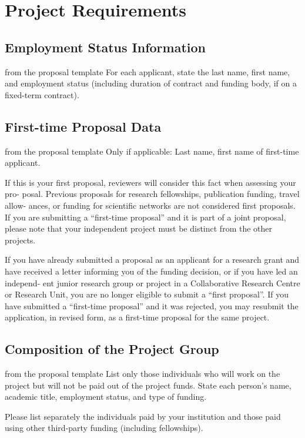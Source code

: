 \section{Project Requirements}

\subsection{Employment Status Information}

\begin{todo}{from the proposal template}
  For each applicant, state the last name, first name, and employment status (including
  duration of contract and funding body, if on a fixed-term contract).
\end{todo}

\subsection{First-time Proposal Data}

\begin{todo}{from the proposal template}
  Only if applicable: Last name, first name of first-time applicant.

  If this is your first proposal, reviewers will consider this fact when assessing your
  pro- posal. Previous proposals for research fellowships, publication funding, travel
  allow- ances, or funding for scientific networks are not considered first proposals. If
  you are submitting a “first-time proposal” and it is part of a joint proposal, please
  note that your independent project must be distinct from the other projects.

  If you have already submitted a proposal as an applicant for a research grant and have
  received a letter informing you of the funding decision, or if you have led an independ-
  ent junior research group or project in a Collaborative Research Centre or Research
  Unit, you are no longer eligible to submit a “first proposal”. If you have submitted a
  “first-time proposal” and it was rejected, you may resubmit the application, in revised
  form, as a first-time proposal for the same project.
\end{todo}

\subsection{Composition of the Project Group}

\begin{todo}{from the proposal template}
  List only those individuals who will work on the project but will not be paid out of the
  project funds. State each person’s name, academic title, employment status, and type of
  funding.

  Please list separately the individuals paid by your institution and those paid using
  other third-party funding (including fellowships).
\end{todo}

